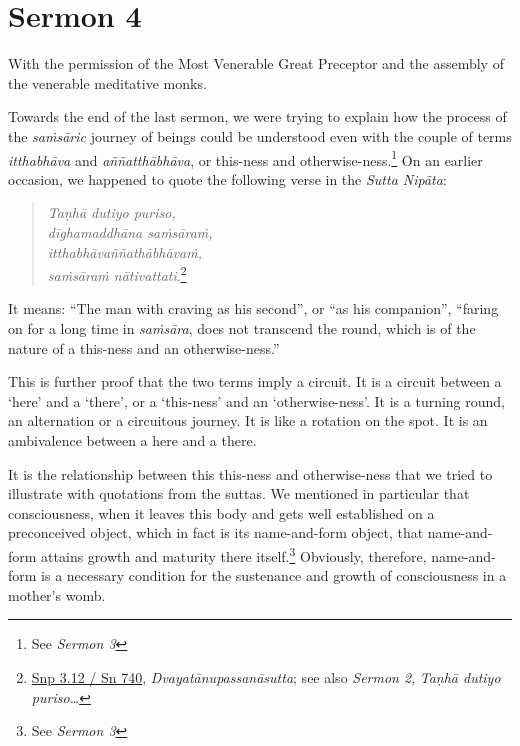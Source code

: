 \chapter{Sermon 4}

\NibbanaOpeningQuote

With the permission of the Most Venerable Great Preceptor and the assembly of the venerable meditative monks.

Towards the end of the last sermon, we were trying to explain how the process of the \emph{saṁsāric} journey of beings could be understood even with the couple of terms \emph{itthabhāva} and \emph{aññatthābhāva}, or this-ness and otherwise-ness.\footnote{See \emph{Sermon 3}} On an earlier occasion, we happened to quote the following verse in the \emph{Sutta Nipāta}:

\begin{quote}
\emph{Taṇhā dutiyo puriso,}\\
\emph{dīghamaddhāna saṁsāraṁ,}\\
\emph{itthabhāvaññathābhāvaṁ,}\\
\emph{saṁsāraṁ nātivattati}.\footnote{\href{https://suttacentral.net/snp3.12/pli/ms}{Snp 3.12 / Sn 740}, \emph{Dvayatānupassanāsutta}; see also \emph{Sermon 2}, \emph{Taṇhā dutiyo puriso\ldots{}}}
\end{quote}

It means: ``The man with craving as his second'', or ``as his companion'', ``faring on for a long time in \emph{saṁsāra}, does not transcend the round, which is of the nature of a this-ness and an otherwise-ness.''

This is further proof that the two terms imply a circuit. It is a circuit between a `here' and a `there', or a `this-ness' and an `otherwise-ness'. It is a turning round, an alternation or a circuitous journey. It is like a rotation on the spot. It is an ambivalence between a here and a there.

It is the relationship between this this-ness and otherwise-ness that we tried to illustrate with quotations from the suttas. We mentioned in particular that consciousness, when it leaves this body and gets well established on a preconceived object, which in fact is its name-and-form object, that name-and-form attains growth and maturity there itself.\footnote{See \emph{Sermon 3}} Obviously, therefore, name-and-form is a necessary condition for the sustenance and growth of consciousness in a mother's womb.

